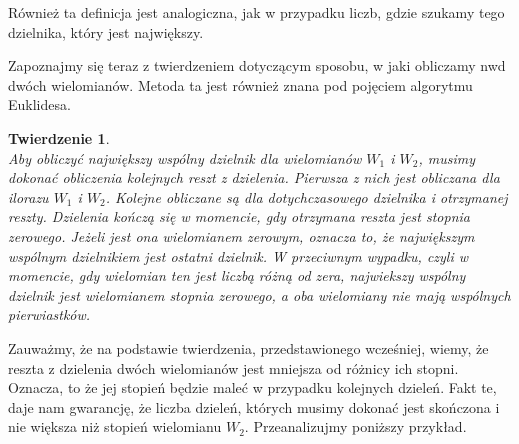 \documentclass[oneside,a4paper]{book}
\newtheorem{theorem}{Twierdzenie}
\begin{document}
	Również ta definicja jest analogiczna, jak w przypadku liczb, gdzie szukamy tego dzielnika, który jest największy.
	
	Zapoznajmy się teraz z twierdzeniem dotyczącym sposobu, w jaki obliczamy nwd dwóch wielomianów. Metoda ta jest również znana pod pojęciem algorytmu Euklidesa.
	
	\begin{theorem}
		$ $\\
		Aby obliczyć największy wspólny dzielnik dla wielomianów $W_1$ i $W_2$, musimy dokonać obliczenia kolejnych reszt z dzielenia. Pierwsza z nich jest obliczana dla ilorazu $W_1$ i $W_2$. Kolejne obliczane są dla dotychczasowego dzielnika i otrzymanej reszty. Dzielenia kończą się w momencie, gdy otrzymana reszta jest stopnia zerowego. Jeżeli jest ona wielomianem zerowym, oznacza to, że największym wspólnym dzielnikiem jest ostatni dzielnik. W przeciwnym wypadku, czyli w momencie, gdy wielomian ten jest liczbą różną od zera, najwiekszy wspólny dzielnik jest wielomianem stopnia zerowego, a oba wielomiany nie mają wspólnych pierwiastków. 
	\end{theorem}
	
	Zauważmy, że na podstawie twierdzenia, przedstawionego wcześniej, wiemy, że reszta z dzielenia dwóch wielomianów jest mniejsza od różnicy ich stopni. Oznacza, to że jej stopień będzie maleć w przypadku kolejnych dzieleń. Fakt te, daje nam gwarancję, że liczba dzieleń, których musimy dokonać jest skończona i nie większa niż stopień wielomianu $W_2$. Przeanalizujmy poniższy przykład.
\end{document}
